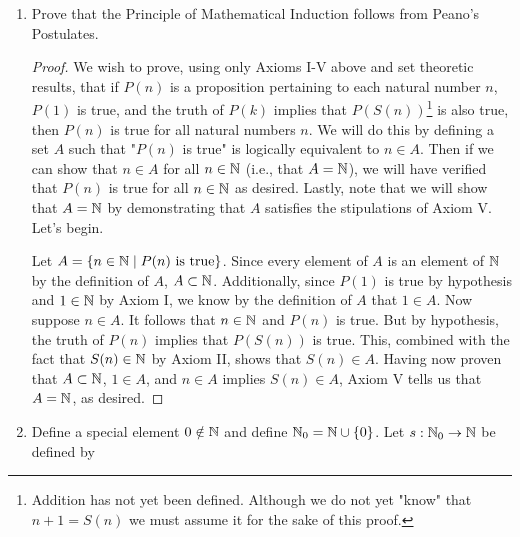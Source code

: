 \documentclass[../main.tex]{subfiles}
\begin{document}
\begin{enumerate}[ref={\thechapter.\arabic*}]
\begin{enumerate}[label={(\alph*)},ref={\theenumi\alph*}]
        \begin{proof}
            We wish to eventually use Axiom V to show that the set on the right side of the above equality (which we shall call $A$) is equal to $\N$. Thus, we begin by demonstrating that $A$ is a subset of $\N$. To do so, we must verify that every element of $A$ is an element of $\N$. Now $A$ consists of 1 and elements in the codomain of $S$, so since $1\in\N$ (Axiom I) and any element of the codomain of $S$ is clearly an element of $\N$ (because the codomain of $S$ \emph{is} $\N$), $A\subset\N$. Moving on, as previously referenced, $1\in A$, so the first property of Axiom V holds. Additionally, the pattern defining $A$ clearly indicates that for any $a\in A$, $S(a)\in A$, so the second property of Axiom V holds. Therefore, by Axiom V, $A=\N$.
        \end{proof}
        \item \label{axr:0.9b}Prove that the Principle of Mathematical Induction follows from Peano's Postulates.
        \begin{proof}
            We wish to prove, using only Axioms I-V above and set theoretic results, that if $P(n)$ is a proposition pertaining to each natural number $n$, $P(1)$ is true, and the truth of $P(k)$ implies that $P(S(n))$\footnote{Addition has not yet been defined. Although we do not yet "know" that $n+1=S(n)$ we must assume it for the sake of this proof.} is also true, then $P(n)$ is true for all natural numbers $n$. We will do this by defining a set $A$ such that "$P(n)$ is true" is logically equivalent to $n\in A$. Then if we can show that $n\in A$ for all $n\in\mathbb{N}$ (i.e., that $A=\N$), we will have verified that $P(n)$ is true for all $n\in\mathbb{N}$ as desired. Lastly, note that we will show that $A=\N$ by demonstrating that $A$ satisfies the stipulations of Axiom V. Let's begin.\par
            Let $A=\{n\in\mathbb{N}\mid P(n)\text{ is true}\}$. Since every element of $A$ is an element of $\N$ by the definition of $A$, $A\subset\N$. Additionally, since $P(1)$ is true by hypothesis and $1\in\N$ by Axiom I, we know by the definition of $A$ that $1\in A$. Now suppose $n\in A$. It follows that $n\in\mathbb{N}$ and $P(n)$ is true. But by hypothesis, the truth of $P(n)$ implies that $P(S(n))$ is true. This, combined with the fact that $S(n)\in\mathbb{N}$ by Axiom II, shows that $S(n)\in A$. Having now proven that $A\subset\N$, $1\in A$, and $n\in A$ implies $S(n)\in A$, Axiom V tells us that $A=\N$, as desired.
        \end{proof}
        \item \label{axr:0.9c}Define a special element $0\notin\mathbb{N}$ and define $\mathbb{N}_0=\mathbb{N}\cup\{0\}$. Let $s:\mathbb{N}_0\to\mathbb{N}$ be defined by

\end{enumerate}
\end{enumerate}
\end{document}

